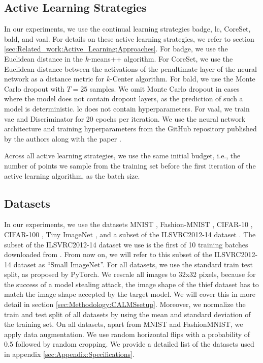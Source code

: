 \subsection{Active Learning Strategies}
\label{sec:ExperimentSetup:ALStrategies}
In our experiments, we use the continual learning strategies \gls{badge}, \gls{lc}, CoreSet, \gls{bald}, and \gls{vaal}. For details on these active learning
strategies, we refer to section \ref{sec:Related_work:Active_Learning:Approaches}. For \gls{badge}, we use the Euclidean distance in the $k$-means++
algorithm. For CoreSet, we use the Euclidean distance between the activations of the penultimate layer of the neural network as a distance metric for $k$-Center
algorithm. For \gls{bald}, we use the Monte Carlo dropout with $T=25$ samples. We omit Monte Carlo dropout in cases where the model does not contain dropout layers,
as the prediction of such a model is deterministic. \gls{lc} does not contain hyperparameters. For \gls{vaal}, we train \gls{vae} and Discriminator for 20 epochs
per iteration. We use the neural network architecture and training hyperparameters from the GitHub repository published by the authors along with the paper 
\cite{vaalRepo}. \par
Across all active learning strategies, we use the same initial budget, i.e., the number of points we sample from the training set before the first iteration
of the active learning algorithm, as the batch size.

\subsection{Datasets}
\label{sec:ExperimentSetup:Datasets}
In our experiments, we use the datasets MNIST \cite{mnist_web}, Fashion-MNIST \cite{xiao2017fashion}, CIFAR-10 \cite{cifar},
CIFAR-100 \cite{cifar}, Tiny ImageNet \cite{le2015tiny}, and a subset of the ILSVRC2012-14 dataset \cite{imagenet}. The subset of the ILSVRC2012-14 dataset we
use is the first of 10 training batches downloaded from \cite{imageNetDataset}. From now on, we will refer to this subset
of the ILSVRC2012-14 dataset as \enquote{Small ImageNet}. For all datasets, we use the standard train test split, as proposed by PyTorch. We rescale all images to 32x32
pixels, because for the success of a model stealing attack, the image shape of the thief dataset has to match the image shape accepted by the target model. We will cover
this in more detail in section \ref{sec:Methodology:CALMSsetup}. Moreover, we normalize the train and test split of all datasets by using the mean and standard deviation
of the training set. On all datasets, apart from MNIST and FashionMNIST, we apply data augmentation. We use random horizontal flips with a probability of 0.5
followed by random cropping. We provide a detailed list of the datasets used in appendix \ref{sec:Appendix:Specifications}. \par

